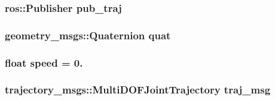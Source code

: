 \subsubsection[{\texorpdfstring{pub\+\_\+traj}{pub_traj}}]{\setlength{\rightskip}{0pt plus 5cm}ros\+::\+Publisher pub\+\_\+traj}\hypertarget{oculus-control_8cpp_a92b67ae724bc0d23b8e85e92e89403df}{}\label{oculus-control_8cpp_a92b67ae724bc0d23b8e85e92e89403df}
\subsubsection[{\texorpdfstring{quat}{quat}}]{\setlength{\rightskip}{0pt plus 5cm}geometry\+\_\+msgs\+::\+Quaternion quat}\hypertarget{oculus-control_8cpp_a71181c8a89676b15be113f74f57c9f23}{}\label{oculus-control_8cpp_a71181c8a89676b15be113f74f57c9f23}
\subsubsection[{\texorpdfstring{speed}{speed}}]{\setlength{\rightskip}{0pt plus 5cm}float speed = 0.}\hypertarget{oculus-control_8cpp_a7f7e4724cf57d59513b39c5ecc81adc8}{}\label{oculus-control_8cpp_a7f7e4724cf57d59513b39c5ecc81adc8}
\subsubsection[{\texorpdfstring{traj\+\_\+msg}{traj_msg}}]{\setlength{\rightskip}{0pt plus 5cm}trajectory\+\_\+msgs\+::\+Multi\+D\+O\+F\+Joint\+Trajectory traj\+\_\+msg}\hypertarget{oculus-control_8cpp_a090c0766fbb77862dd8cc0cca99d688b}{}\label{oculus-control_8cpp_a090c0766fbb77862dd8cc0cca99d688b}
